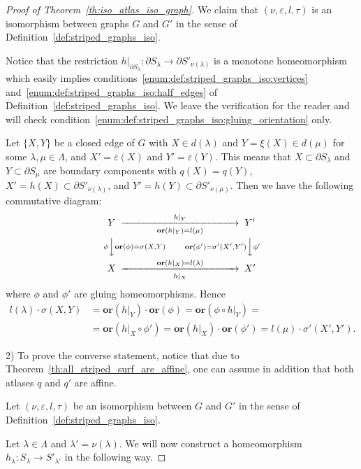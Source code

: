 \documentclass[12pt, reqno]{amsart}
\newcommand\dif{h}
\newcommand{\strip}{S}
\newcommand{\bdX}{X}
\newcommand{\bdY}{Y}
\newcommand{\stInd}{{\lambda}}
\newcommand{\StInd}{\Lambda}
\newcommand{\qmap}{q}
\newcommand\Gr{G}
\newcommand\ori{\mathbf{or}}
\newcommand\lori{l}
\newcommand\tori{\tau}
\newcommand\edge[2]{\{#1,#2\}}
\newcommand\eiso{\varepsilon}
\newcommand\viso{\nu}
\begin{document}
\begin{proof}[Proof of Theorem~\ref{th:iso_atlas_iso_graph}]
We claim that $(\viso, \eiso, \lori, \tori)$ is an isomorphism between graphs $\Gr$ and $\Gr'$ in the sense of Definition~\ref{def:striped_graphs_iso}.

Notice that the restriction $\dif|_{\partial\strip_{\stInd}}: \partial\strip_{\stInd} \to \partial\strip'_{\viso(\stInd)}$ is a monotone homeomorphism which easily implies conditions~\ref{enum:def:striped_graphs_iso:vertices} and~\ref{enum:def:striped_graphs_iso:half_edges} of Definition~\ref{def:striped_graphs_iso}.
We leave the verification for the reader and will check condition~\ref{enum:def:striped_graphs_iso:gluing_orientation} only.

Let $\edge{\bdX}{\bdY}$ be a closed edge of $\Gr$ with $\bdX \in d(\stInd)$ and $\bdY=\xi(\bdX) \in d(\mu)$ for some $\stInd, \mu \in\StInd$, and 
$\bdX'=\eiso(\bdX)$ and $\bdY'=\eiso(\bdY)$.
This means that $\bdX \subset \partial \strip_{\stInd}$ and $\bdY \subset \partial \strip_{\mu}$ are boundary components with $\qmap(\bdX) = \qmap(\bdY)$, $\bdX' = \dif(\bdX) \subset \partial \strip'_{\viso(\stInd)}$, and $\bdY' = \dif(\bdY) \subset \partial \strip'_{\viso(\mu)}$.
Then we have the following commutative diagram:
\[
\begin{CD}
\bdY @>{\dif|_{\bdY}}>{~~~~~~~~~~\ori(\dif|_{\bdY}) = \lori(\mu)~~~~~~~~~~}> \bdY' \\
@V{\phi}V{\ori(\phi)  = \sigma(\bdX,\bdY)}V @V{\ori(\phi')= \sigma'(\bdX',\bdY')}V{\phi'}V \\
\bdX @>~~~~~~~~~~\ori(\dif|_{\bdX}) = \lori(\stInd) ~~~~~~~~~~>{\dif|_{\bdX}}> \bdX'
\end{CD}
\]
where $\phi$ and $\phi'$ are gluing homeomorphisms.
Hence
\begin{align*}
\lori(\stInd) \cdot \sigma(\bdX,\bdY) &=
\ori(\dif|_{\bdY})\cdot \ori(\phi) =  \ori(\phi\circ \dif|_{\bdY}) = \\
&= \ori(\dif|_{\bdX} \circ \phi') =
\ori(\dif|_{\bdX}) \cdot \ori(\phi') =
\lori(\mu) \cdot \sigma'(\bdX',\bdY').
\end{align*}


2) To prove the converse statement, notice that due to Theorem~\ref{th:all_striped_surf_are_affine}, one can assume in addition that both atlases $\qmap$ and $\qmap'$ are affine.

Let $(\viso,\eiso,\lori, \tori)$ be an isomorphism between $\Gr$ and $\Gr'$ in the sense of Definition~\ref{def:striped_graphs_iso}.

Let $\stInd \in \StInd$ and $\stInd' = \viso(\stInd)$.
We will now construct a homeomorphism $\dif_{\stInd}:\strip_{\stInd} \to \strip'_{\stInd'}$ in the following way.


\end{proof}
\end{document}
